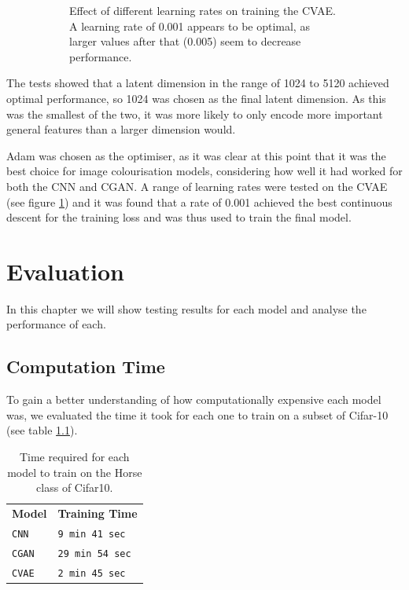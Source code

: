 \documentclass{l4proj}
\begin{document}
\begin{figure}[H]
\begin{subfigure}[t]{0.48\textwidth}
        \caption{Effect of different learning rates on training the CVAE. A learning rate of 0.001 appears to be optimal, as larger values after that (0.005) seem to decrease performance.}
        \label{fig:vae_learning_rates}
    \end{subfigure} 
    \caption{}
    \label{fig:vae_hyperparameters}
\end{figure}

The tests showed that a latent dimension in the range of 1024 to 5120 achieved optimal performance, so 1024 was chosen as the final latent dimension. As this was the smallest of the two, it was more likely to only encode more important general features than a larger dimension would.

Adam was chosen as the optimiser, as it was clear at this point that it was the best choice for image colourisation models, considering how well it had worked for both the CNN and CGAN. A range of learning rates were tested on the CVAE (see figure \ref{fig:vae_learning_rates}) and it was found that a rate of 0.001 achieved the best continuous descent for the training loss and was thus used to train the final model.

\chapter{Evaluation} 
In this chapter we will show testing results for each model and analyse the performance of each.

\section{Computation Time}
\label{computationtime}
To gain a better understanding of how computationally expensive each model was, we evaluated the time it took for each one to train on a subset of Cifar-10 (see table \ref{tab:times}).

\begin{table}[H]
    \centering
    \caption{Time required for each model to train on the Horse class of Cifar10.}
    \label{tab:times}
    \begin{tabular}{ll}
        \textbf{Model} & \textbf{Training Time} \\   
        \texttt{CNN} & \texttt{9 min 41 sec} \\
        \texttt{CGAN} & \texttt{29 min 54 sec} \\
        \texttt{CVAE} & \texttt{2 min 45 sec} \\
    \end{tabular}
\end{table}
\end{document}
